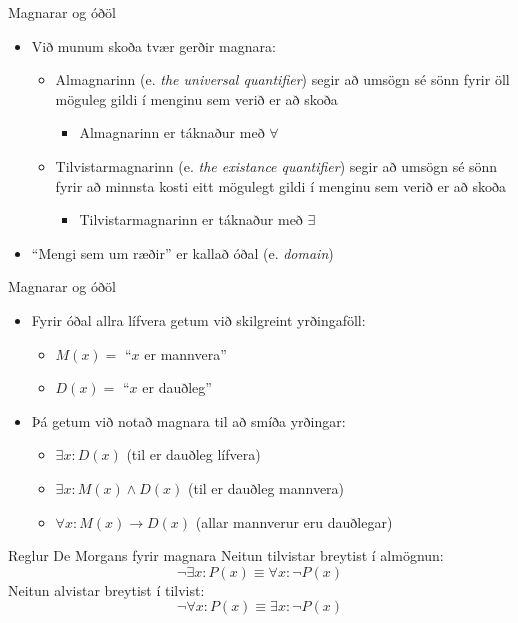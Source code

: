 \documentclass{beamer}
\begin{document}
\begin{frame}{Magnarar og óðöl}
\begin{itemize}
 \item Við munum skoða tvær gerðir magnara:
 \begin{itemize}
  \item Almagnarinn (e. \emph{the universal quantifier}) segir að umsögn sé sönn fyrir öll möguleg gildi í menginu sem verið er að skoða
  \begin{itemize}
   \item Almagnarinn er táknaður með $\forall$
  \end{itemize}
  \item Tilvistarmagnarinn (e. \emph{the existance quantifier}) segir að umsögn sé sönn fyrir að minnsta kosti eitt mögulegt gildi í menginu sem verið er að skoða
  \begin{itemize}
   \item Tilvistarmagnarinn er táknaður með $\exists$
  \end{itemize}
 \end{itemize}
 \item ``Mengi sem um ræðir'' er kallað óðal (e. \emph{domain})
\end{itemize}
\end{frame}

\begin{frame}{Magnarar og óðöl}
\begin{itemize}
 \item Fyrir óðal allra lífvera getum við skilgreint yrðingaföll:
 \begin{itemize}
  \item $M(x) = $ ``$x$ er mannvera''
  \item $D(x) = $ ``$x$ er dauðleg''
 \end{itemize}
 \item Þá getum við notað magnara til að smíða yrðingar:
 \begin{itemize}
  \item $\exists x: D(x)$ (til er dauðleg lífvera)
  \item $\exists x: M(x) \land D(x)$ (til er dauðleg mannvera) \pause
  \item $\forall x: M(x) \to D(x)$ (allar mannverur eru dauðlegar)
 \end{itemize}
\end{itemize}
\end{frame}

\begin{frame}{Reglur De Morgans fyrir magnara}
Neitun tilvistar breytist í almögnun:
\[
 \lnot \exists x: P(x) \equiv \forall x: \lnot P(x)
\]
Neitun alvistar breytist í tilvist:
\[
 \lnot \forall x: P(x) \equiv \exists x: \lnot P(x)
\]
\end{frame}
\end{document}
